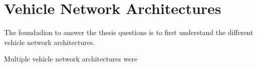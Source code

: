 \chapter{Vehicle Network Architectures}
\label{chp:architectures}

The foundadion to answer the thesis questions is to first understand the different vehicle network architectures.

Multiple vehicle network architectures were 